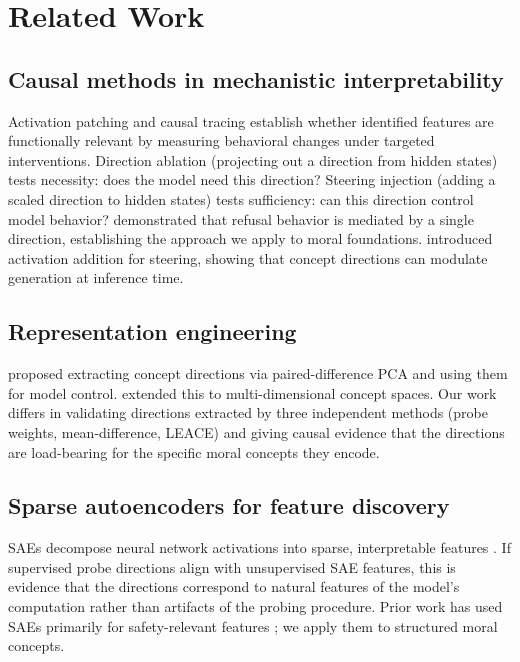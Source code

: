 \section{Related Work}\label{related-work}

\subsection{Causal methods in mechanistic interpretability}\label{causal-methods-in-mechanistic-interpretability}

Activation patching \citep{vig2020causal,meng2022locating} and causal tracing \citep{geiger2021causal} establish whether identified features are functionally relevant by measuring behavioral changes under targeted interventions.
Direction ablation (projecting out a direction from hidden states) tests necessity: does the model need this direction?
Steering injection (adding a scaled direction to hidden states) tests sufficiency: can this direction control model behavior?
\citet{arditi2024refusal} demonstrated that refusal behavior is mediated by a single direction, establishing the approach we apply to moral foundations.
\citet{turner2023activation} introduced activation addition for steering, showing that concept directions can modulate generation at inference time.

\subsection{Representation engineering}\label{representation-engineering}

\citet{zou2023representation} proposed extracting concept directions via paired-difference PCA and using them for model control.
\citet{marks2024geometry} extended this to multi-dimensional concept spaces.
Our work differs in validating directions extracted by three independent methods (probe weights, mean-difference, LEACE) and giving causal evidence that the directions are load-bearing for the specific moral concepts they encode.

\subsection{Sparse autoencoders for feature discovery}\label{sparse-autoencoders-for-feature-discovery}

SAEs decompose neural network activations into sparse, interpretable features \citep{bricken2023monosemanticity,cunningham2023sparse}.
If supervised probe directions align with unsupervised SAE features, this is evidence that the directions correspond to natural features of the model's computation rather than artifacts of the probing procedure.
Prior work has used SAEs primarily for safety-relevant features \citep{templeton2024scaling}; we apply them to structured moral concepts.

